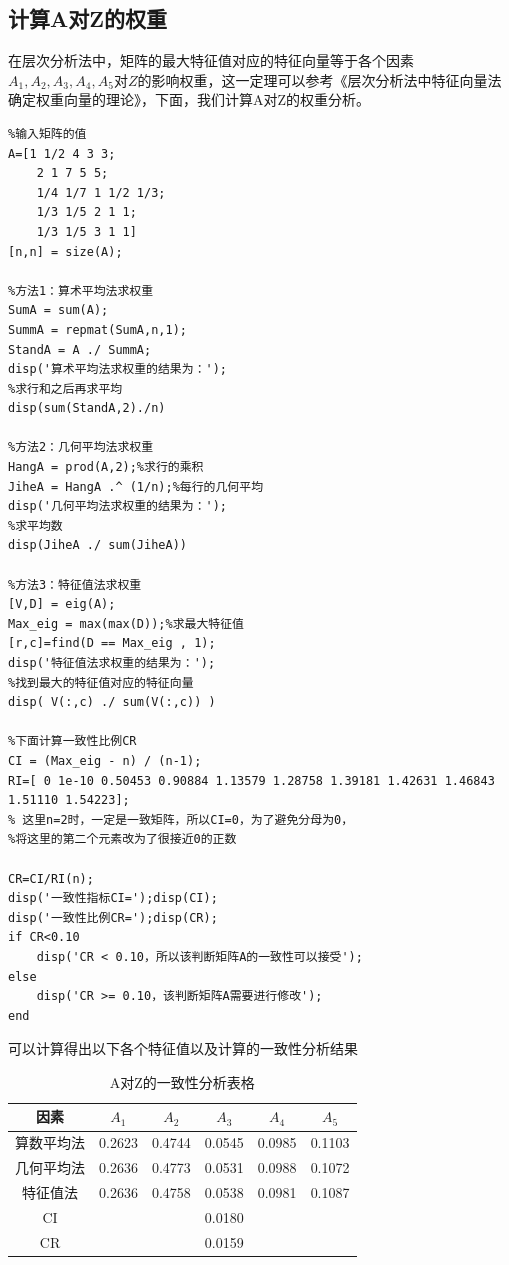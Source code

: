 \documentclass{ctexart}
\begin{document}
\subsection{计算A对Z的权重}
在层次分析法中，矩阵的最大特征值对应的特征向量等于各个因素$A_{1},A_{2},A_{3},A_{4},A_{5}$对$Z$的影响权重，这一定理可以参考《层次分析法中特征向量法确定权重向量的理论》\cite{ref1}，下面，我们计算A对Z的权重分析。

\begin{lstlisting}
%输入矩阵的值
A=[1 1/2 4 3 3;
    2 1 7 5 5;
    1/4 1/7 1 1/2 1/3;
    1/3 1/5 2 1 1;
    1/3 1/5 3 1 1]
[n,n] = size(A);

%方法1：算术平均法求权重
SumA = sum(A);
SummA = repmat(SumA,n,1);
StandA = A ./ SummA;
disp('算术平均法求权重的结果为：');
%求行和之后再求平均
disp(sum(StandA,2)./n)

%方法2：几何平均法求权重
HangA = prod(A,2);%求行的乘积
JiheA = HangA .^ (1/n);%每行的几何平均
disp('几何平均法求权重的结果为：');
%求平均数
disp(JiheA ./ sum(JiheA))

%方法3：特征值法求权重
[V,D] = eig(A);
Max_eig = max(max(D));%求最大特征值
[r,c]=find(D == Max_eig , 1);
disp('特征值法求权重的结果为：');
%找到最大的特征值对应的特征向量
disp( V(:,c) ./ sum(V(:,c)) )

%下面计算一致性比例CR
CI = (Max_eig - n) / (n-1);
RI=[ 0 1e-10 0.50453 0.90884 1.13579 1.28758 1.39181 1.42631 1.46843 1.51110 1.54223];
% 这里n=2时，一定是一致矩阵，所以CI=0，为了避免分母为0，
%将这里的第二个元素改为了很接近0的正数

CR=CI/RI(n);
disp('一致性指标CI=');disp(CI);
disp('一致性比例CR=');disp(CR);
if CR<0.10
    disp('CR < 0.10，所以该判断矩阵A的一致性可以接受');
else
    disp('CR >= 0.10，该判断矩阵A需要进行修改');
end
\end{lstlisting}

可以计算得出以下各个特征值以及计算的一致性分析结果

\begin{table}[h!]
    \centering
    \begin{tabular}{|c|c|c|c|c|c|}
    \hline
         因素&  $A_{1}$ & $A_{2}$ & $A_{3}$ & $A_{4}$& $A_{5}$ \\
         \hline
         算数平均法 &0.2623 &0.4744 &0.0545 &0.0985 &0.1103\\
         \hline
         几何平均法 &0.2636 &0.4773 &0.0531 &0.0988 &0.1072\\
         \hline
         特征值法 &0.2636 &0.4758 &0.0538 &0.0981 &0.1087\\
         \hline
         CI & \multicolumn{5}{|c|}{0.0180}\\
         \hline
         CR & \multicolumn{5}{|c|}{0.0159}\\
         \hline
    \end{tabular}
    \caption{A对Z的一致性分析表格}
    \label{表：5}
\end{table}
\end{document}
